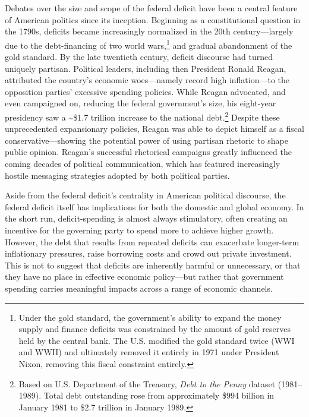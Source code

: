 \documentclass[
  12pt,
]{article}
\begin{document}
Debates over the size and scope of the federal deficit have been a
central feature of American politics since its inception. Beginning as a
constitutional question in the 1790s, deficits became increasingly
normalized in the 20th century---largely due to the debt-financing of
two world wars,\footnote{Under the gold standard, the government's
  ability to expand the money supply and finance deficits was
  constrained by the amount of gold reserves held by the central bank.
  The U.S. modified the gold standard twice (WWI and WWII) and
  ultimately removed it entirely in 1971 under President Nixon, removing
  this fiscal constraint entirely.} and gradual abandonment of the gold
standard. By the late twentieth century, deficit discourse had turned
uniquely partisan. Political leaders, including then President Ronald
Reagan, attributed the country's economic woes---namely record high
inflation---to the opposition parties' excessive spending policies.
While Reagan advocated, and even campaigned on, reducing the federal
government's size, his eight-year presidency saw a \textasciitilde\$1.7
trillion increase to the national debt.\footnote{Based on U.S.
  Department of the Treasury, \emph{Debt to the Penny} dataset
  (1981--1989). Total debt outstanding rose from approximately \$994
  billion in January 1981 to \$2.7 trillion in January 1989.} Despite
these unprecedented expansionary policies, Reagan was able to depict
himself as a fiscal conservative---showing the potential power of using
partisan rhetoric to shape public opinion. Reagan's successful
rhetorical campaigns greatly influenced the coming decades of political
communication, which has featured increasingly hostile messaging
strategies adopted by both political parties.

Aside from the federal deficit's centrality in American political
discourse, the federal deficit itself has implications for both the
domestic and global economy. In the short run, deficit-spending is
almost always stimulatory, often creating an incentive for the governing
party to spend more to achieve higher growth. However, the debt that
results from repeated deficits can exacerbate longer-term inflationary
pressures, raise borrowing costs and crowd out private investment. This
is not to suggest that deficits are inherently harmful or unnecessary,
or that they have no place in effective economic policy---but rather
that government spending carries meaningful impacts across a range of
economic channels.
\end{document}
